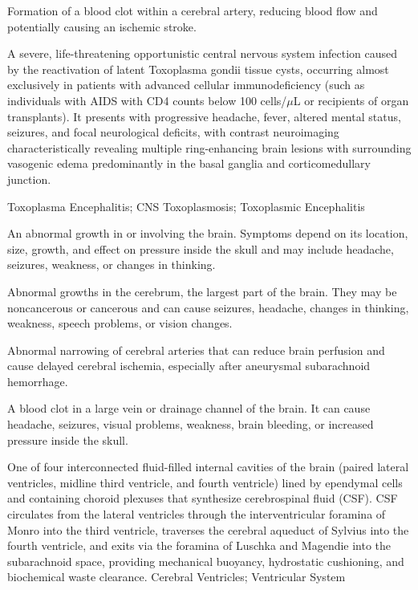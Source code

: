  Formation of a blood clot within a cerebral artery, reducing blood flow and potentially causing an ischemic stroke.

 A severe, life-threatening opportunistic central nervous system infection caused by the reactivation of latent Toxoplasma gondii tissue cysts, occurring almost exclusively in patients with advanced cellular immunodeficiency (such as individuals with AIDS with CD4 counts below 100 cells/$\mu$L or recipients of organ transplants). It presents with progressive headache, fever, altered mental status, seizures, and focal neurological deficits, with contrast neuroimaging characteristically revealing multiple ring-enhancing brain lesions with surrounding vasogenic edema predominantly in the basal ganglia and corticomedullary junction.

\synonyms
Toxoplasma Encephalitis; CNS Toxoplasmosis; Toxoplasmic Encephalitis

 An abnormal growth in or involving the brain. Symptoms depend on its location, size, growth, and effect on pressure inside the skull and may include headache, seizures, weakness, or changes in thinking.

 Abnormal growths in the cerebrum, the largest part of the brain. They may be noncancerous or cancerous and can cause seizures, headache, changes in thinking, weakness, speech problems, or vision changes.

 Abnormal narrowing of cerebral arteries that can reduce brain perfusion and cause delayed cerebral ischemia, especially after aneurysmal subarachnoid hemorrhage.

 A blood clot in a large vein or drainage channel of the brain. It can cause headache, seizures, visual problems, weakness, brain bleeding, or increased pressure inside the skull.

 One of four interconnected fluid-filled internal cavities of the brain (paired lateral ventricles, midline third ventricle, and fourth ventricle) lined by ependymal cells and containing choroid plexuses that synthesize cerebrospinal fluid (CSF). CSF circulates from the lateral ventricles through the interventricular foramina of Monro into the third ventricle, traverses the cerebral aqueduct of Sylvius into the fourth ventricle, and exits via the foramina of Luschka and Magendie into the subarachnoid space, providing mechanical buoyancy, hydrostatic cushioning, and biochemical waste clearance.
\synonyms
Cerebral Ventricles; Ventricular System

